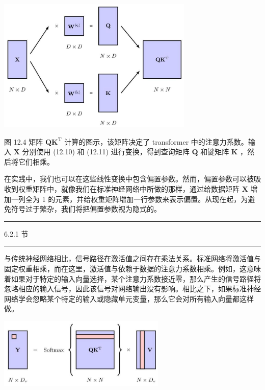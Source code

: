 \documentclass[10pt]{article}
\newcommand{\HRule}{\begin{center}\rule{0.9\linewidth}{0.2mm}\end{center}}
\begin{document}
\begin{center}
\includegraphics[max width=0.7\textwidth]{images/0194e279-9b28-703a-88f4-c3ac21e2010d_384_583_344_903_617_0.jpg}
\end{center}
\hspace*{3em} 

图 12.4 矩阵 \({\mathbf{{QK}}}^{\mathrm{T}}\) 计算的图示，该矩阵决定了 transformer 中的注意力系数。输入 \(\mathbf{X}\) 分别使用 (12.10) 和 (12.11) 进行变换，得到查询矩阵 \(\mathbf{Q}\) 和键矩阵 \(\mathbf{K}\) ，然后将它们相乘。

在实践中，我们也可以在这些线性变换中包含偏置参数。然而，偏置参数可以被吸收到权重矩阵中，就像我们在标准神经网络中所做的那样，通过给数据矩阵 \(\mathbf{X}\) 增加一列全为 1 的元素，并给权重矩阵增加一行参数来表示偏置。从现在起，为避免符号过于繁杂，我们将把偏置参数视为隐式的。

\HRule

6.2.1 节

\HRule

与传统神经网络相比，信号路径在激活值之间存在乘法关系。标准网络将激活值与固定权重相乘，而在这里，激活值与依赖于数据的注意力系数相乘。例如，这意味着如果对于特定的输入向量选择，某个注意力系数接近零，那么产生的信号路径将忽略相应的输入信号，因此该信号对网络输出没有影响。相比之下，如果标准神经网络学会忽略某个特定的输入或隐藏单元变量，那么它会对所有输入向量都这样做。

\begin{center}
\includegraphics[max width=0.6\textwidth]{images/0194e279-9b28-703a-88f4-c3ac21e2010d_384_776_1657_770_324_0.jpg}
\end{center}
\hspace*{3em} 
\end{document}
